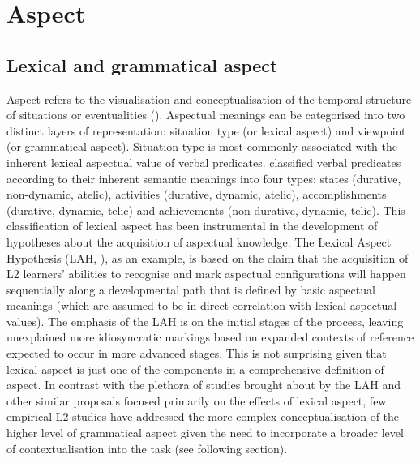 \documentclass[output=paper,modfonts,nonflat,newtxmath]{langsci/langscibook}
\begin{document}
\section{Aspect} %
\label{sec:salaberry:1}

\subsection{Lexical and grammatical aspect}
\label{sec:salaberry:1.1}

Aspect refers to the visualisation and conceptualisation of the temporal structure of situations or eventualities (\citealt{Comrie1976, Dahl1985, Smith1997}). Aspectual meanings can be categorised into two distinct layers of representation: situation type (or lexical aspect) and viewpoint (or grammatical aspect). Situation type is most commonly associated with the inherent lexical aspectual value of verbal predicates. \citet{Vendler1967} classified verbal predicates according to their inherent semantic meanings into four types: states (durative, non-dynamic, atelic), activities (durative, dynamic, atelic), accomplishments (durative, dynamic, telic) and achievements (non-durative, dynamic, telic). This classification of lexical aspect has been instrumental in the development of hypotheses about the acquisition of aspectual knowledge. The Lexical Aspect Hypothesis (LAH, \citealt{Andersen1991}), as an example, is based on the claim that the acquisition of L2 learners’ abilities to recognise and mark aspectual configurations will happen sequentially along a developmental path that is defined by basic aspectual meanings (which are assumed to be in direct correlation with lexical aspectual values). The emphasis of the LAH is on the initial stages of the process, leaving unexplained more idiosyncratic markings based on expanded contexts of reference expected to occur in more advanced stages. This is not surprising given that lexical aspect is just one of the components in a comprehensive definition of aspect. In contrast with the plethora of studies brought about by the LAH and other similar proposals focused primarily on the effects of lexical aspect, few empirical L2 studies have addressed the more complex conceptualisation of the higher level of grammatical aspect given the need to incorporate a broader level of contextualisation into the task (see following section).
\end{document}
